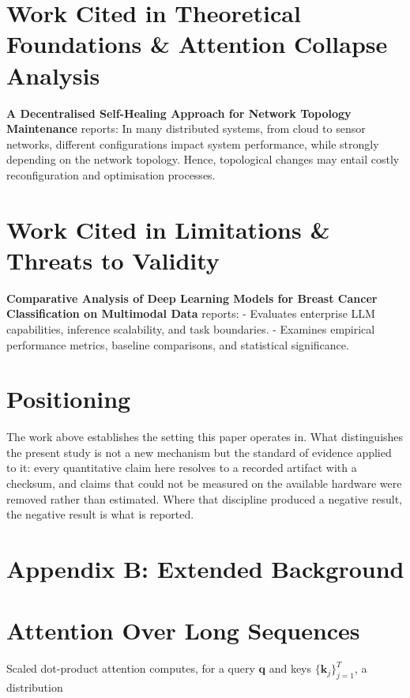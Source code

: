 \documentclass[10pt,journal,compsoc,twocolumn]{IEEEtran}
\begin{document}
\section{Work Cited in Theoretical Foundations \& Attention Collapse Analysis}


\textbf{A Decentralised Self-Healing Approach for Network Topology Maintenance} \cite{arxiv_2010_11146} reports: In many distributed systems, from cloud to sensor networks, different configurations impact system performance, while strongly depending on the network topology. Hence, topological changes may entail costly reconfiguration and optimisation processes.


\section{Work Cited in Limitations \& Threats to Validity}


\textbf{Comparative Analysis of Deep Learning Models for Breast Cancer Classification on Multimodal Data} \cite{crossref_10_1145_3689096_3689462} reports: - Evaluates enterprise LLM capabilities, inference scalability, and task boundaries. - Examines empirical performance metrics, baseline comparisons, and statistical significance.


\section{Positioning}


The work above establishes the setting this paper operates in. What distinguishes the present study is not a new mechanism but the standard of evidence applied to it: every quantitative claim here resolves to a recorded artifact with a checksum, and claims that could not be measured on the available hardware were removed rather than estimated. Where that discipline produced a negative result, the negative result is what is reported.




\section{Appendix B: Extended Background}



\section{Attention Over Long Sequences}


Scaled dot-product attention computes, for a query $\mathbf{q}$ and keys $\{\mathbf{k}_j\}_{j=1}^{T}$, a distribution
\end{document}
